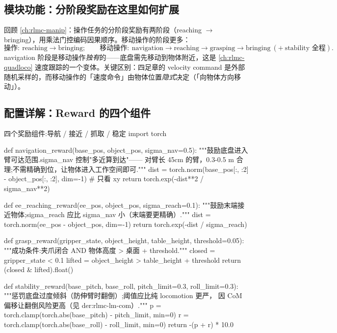 \subsection{模块功能：分阶段奖励在这里如何扩展}
\label{sec:rlmc-lm-reward-stages}

回顾 \cref{ch:rlmc-manip}：操作任务的分阶段奖励有两阶段（reaching $\to$ bringing），用乘法门控编码因果顺序。移动操作的阶段更多：
\begin{equation*}
\text{操作}:\ \text{reaching}\to\text{bringing};\qquad
\text{移动操作}:\ \text{navigation}\to\text{reaching}\to\text{grasping}\to\text{bringing}\ (+\ \text{stability 全程}).
\end{equation*}
navigation 阶段是移动操作\emph{独有}的——底盘需先移动到物体附近，这是 \cref{ch:rlmc-quadloco} 速度跟踪的一个变体。关键区别：四足章的 velocity command 是外部随机采样的，而移动操作的「速度命令」由物体位置\emph{隐式}决定（「向物体方向移动」）。

\subsection{配置详解：Reward 的四个组件}
\label{sec:rlmc-lm-reward-comp}

\begin{codebox}[Python]{四个奖励组件:导航 / 接近 / 抓取 / 稳定}
import torch

def navigation_reward(base_pos, object_pos, sigma_nav=0.5):
    """鼓励底盘进入臂可达范围.sigma_nav 控制"多近算到达"——
    对臂长 45cm 的臂，0.3-0.5 m 合理;不需精确到位，让物体进入工作空间即可."""
    dist = torch.norm(base_pos[:, :2] - object_pos[:, :2], dim=-1)  # 只看 xy
    return torch.exp(-dist**2 / sigma_nav**2)

def ee_reaching_reward(ee_pos, object_pos, sigma_reach=0.1):
    """鼓励末端接近物体;sigma_reach 应比 sigma_nav 小（末端要更精确）."""
    dist = torch.norm(ee_pos - object_pos, dim=-1)
    return torch.exp(-dist / sigma_reach)

def grasp_reward(gripper_state, object_height, table_height, threshold=0.05):
    """成功条件:夹爪闭合 AND 物体高度 > 桌面 + threshold."""
    closed = gripper_state < 0.1
    lifted = object_height > table_height + threshold
    return (closed & lifted).float()

def stability_reward(base_pitch, base_roll, pitch_limit=0.3, roll_limit=0.3):
    """惩罚底盘过度倾斜（防伸臂时翻倒）;阈值应比纯 locomotion 更严，
    因 CoM 偏移让翻倒风险更高（见 der:rlmc-lm-com）."""
    p = torch.clamp(torch.abs(base_pitch) - pitch_limit, min=0)
    r = torch.clamp(torch.abs(base_roll) - roll_limit, min=0)
    return -(p + r) * 10.0
\end{codebox}

